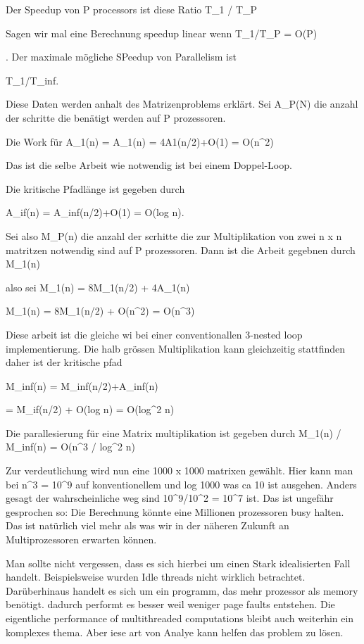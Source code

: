 Der Speedup von P processors ist diese Ratio T_1 / T_P


Sagen wir mal eine Berechnung speedup linear wenn 
T_1/T_P = O(P)

. Der maximale mögliche SPeedup von Parallelism ist 

T_1/T_inf. 

Diese Daten werden anhalt des Matrizenproblems erklärt. Sei A_P(N) die anzahl der schritte die benätigt werden auf P prozessoren. 


Die Work für A_1(n) = A_1(n) = 4A1(n/2)+O(1) = O(n^2)

Das ist die selbe Arbeit wie notwendig ist bei einem Doppel-Loop.


Die kritische Pfadlänge ist gegeben durch 

A_if(n) = A_inf(n/2)+O(1) = O(log n).


Sei also M_P(n) die anzahl der scrhitte die zur Multiplikation von zwei n x n matritzen notwendig sind auf P prozessoren. Dann ist die Arbeit gegebnen durch M_1(n) 

also sei
M_1(n) = 8M_1(n/2) + 4A_1(n)

M_1(n) = 8M_1(n/2) + O(n^2)
= O(n^3)


Diese arbeit ist die gleiche wi bei einer conventionallen 3-nested loop implementierung. Die halb grössen Multiplikation kann gleichzeitig stattfinden daher ist der kritische pfad

M_inf(n) = M_inf(n/2)+A_inf(n)

= M_if(n/2) + O(log n)
= O(log^2 n)

Die parallesierung für eine Matrix multiplikation ist gegeben durch M_1(n) / M_inf(n) = O(n^3 / log^2 n)


Zur verdeutlichung wird nun eine 1000 x 1000 matrixen gewählt. Hier kann man bei 
n^3 = 10^9 
auf konventionellem und log 1000 was ca 10 ist ausgehen. Anders gesagt der wahrscheinliche weg sind 
10^9/10^2 = 10^7 
ist. Das ist ungefähr gesprochen so: Die Berechnung könnte eine Millionen prozessoren busy halten. Das ist natürlich viel mehr als was wir in der näheren Zukunft an Multiprozessoren erwarten können. 


Man sollte nicht vergessen, dass es sich hierbei um einen Stark idealisierten Fall handelt. Beispielsweise wurden Idle threads nicht wirklich betrachtet. Darüberhinaus handelt es sich um ein programm, das mehr prozessor als memory benötigt. dadurch performt es besser weil weniger page faults entstehen. Die eigentliche performance of multithreaded computations bleibt auch weiterhin ein komplexes thema. Aber iese art von Analye kann helfen das problem zu lösen.